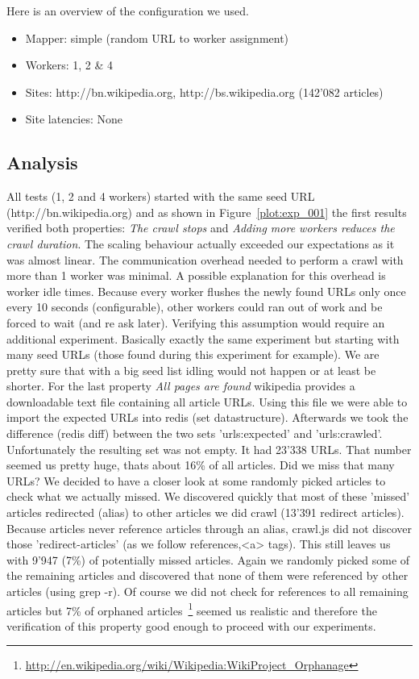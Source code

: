 Here is an overview of the configuration we used.

\begin{itemize}
  \item Mapper: simple (random URL to worker assignment)
  \item Workers: 1, 2 \& 4
  \item Sites: http://bn.wikipedia.org, http://bs.wikipedia.org (142'082 articles)
  \item Site latencies: None
\end{itemize}

\subsection{Analysis}

 All tests (1, 2 and 4 workers) started with the same seed URL (http://bn.wikipedia.org) and as shown in Figure~\ref{plot:exp_001} the first results verified both properties: \emph{The crawl stops} and \emph{Adding more workers reduces the crawl duration}. The scaling behaviour actually exceeded our expectations as it was almost linear. The communication overhead needed to perform a crawl with more than 1 worker was minimal. A possible explanation for this overhead is worker idle times. Because every worker flushes the newly found URLs only once every 10 seconds (configurable), other workers could ran out of work and be forced to wait (and re ask later). Verifying this assumption would require an additional experiment. Basically exactly the same experiment but starting with many seed URLs (those found during this experiment for example). We are pretty sure that with a big seed list idling would not happen or at least be shorter.
\newline
\newline
For the last property \emph{All pages are found} wikipedia provides a downloadable text file containing all article URLs. Using this file we were able to import the expected URLs into redis (set datastructure). Afterwards we took the difference (redis diff) between the two sets 'urls:expected' and 'urls:crawled'. Unfortunately the resulting set was not empty. It had 23'338 URLs. That number seemed us pretty huge, thats about 16\% of all articles. Did we miss that many URLs? We decided to have a closer look at some randomly picked articles to check what we actually missed. We discovered quickly that most of these 'missed' articles redirected (alias) to other articles we did crawl (13'391 redirect articles). Because articles never reference articles through an alias, crawl.js did not discover those 'redirect-articles' (as we follow references,<a> tags). This still leaves us with 9'947 (7\%) of potentially missed articles. Again we randomly picked some of the remaining articles and discovered that none of them were referenced by other articles (using grep -r). Of course we did not check for references to all remaining articles but 7\% of orphaned articles~\footnote{\url{http://en.wikipedia.org/wiki/Wikipedia:WikiProject_Orphanage}} seemed us realistic and therefore the verification of this property good enough to proceed with our experiments.
